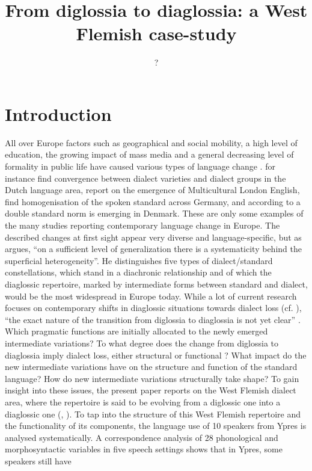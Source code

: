 \documentclass[output=paper]{LSP/langsci}
\author{?\affiliation{??}}
\title{From diglossia to diaglossia: a West Flemish case-study}
\begin{document}
\newcommand{\ghysvara}{\textsuperscript{[-st,+ypr]~~}}
\newcommand{\ghysvarb}{\textsuperscript{[+st,+ypr]~~}}
\newcommand{\ghysvarc}{\textsuperscript{[-st,-ypr]~~}}
\newcommand{\ghysvard}{\textsuperscript{[+st,-ypr]~~}}

\newcommand{\tabitem}{{\textbullet}~~}
 
 

\section{Introduction}

All over Europe factors such as geographical and social mobility, a high level of education, the growing impact of mass media and a general decreasing level of formality in public life have caused various types of language change \citep[355]{taeldeman_linguistic_2009}. \citet{heeringa_convergence_2014} for instance find convergence between dialect varieties and dialect groups in the Dutch language area, \citet{cheshire_contact_2011} report on the emergence of Multicultural London English, \citet{auer_demotisation_2011} find homogenisation of the spoken standard across Germany, and according to \citet{kristiansen_two_2001} a double standard norm is emerging in Denmark. These are only some examples of the many studies reporting contemporary language change in Europe. The described changes at first sight appear very diverse and language-specific, but as \citet[7]{auer_europes_2005} argues, “on a sufficient level of generalization there is a systematicity behind the superficial heterogeneity”. He distinguishes five types of dialect/standard constellations, which stand in a diachronic relationship and of which the diaglossic repertoire, marked by intermediate forms between standard and dialect, would be the most widespread in Europe today. While a lot of current research focuses on contemporary shifts in diaglossic situations towards dialect loss (cf. \citealt{ghyselen_impact_2013,grondelaers_standard_2011,vandekerckhove_dialect_2009}), “the exact nature of the transition from diglossia to diaglossia is not yet clear” \citep[23]{auer_europes_2005}. Which pragmatic functions are initially allocated to the newly emerged intermediate variations? To what degree does the change from diglossia to diaglossia imply dialect loss, either structural or functional \citep{auer_convergence_1996}? What impact do the new intermediate variations have on the structure and function of the standard language? How do new intermediate variations structurally take shape? To gain insight into these issues, the present paper reports on the West Flemish dialect area, where the repertoire is said to be evolving from a diglossic one into a diaglossic one (\citealt{de_caluwe_tussentaal_2009}, \citealt[272]{willemyns_-standardization_2007}). To tap into the structure of this West Flemish repertoire and the functionality of its components, the language use of 10 speakers from Ypres is analysed systematically. A correspondence analysis of 28 phonological and morphosyntactic variables in five speech settings shows that in Ypres, some speakers still have 
\end{document}
